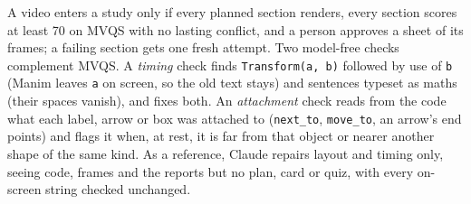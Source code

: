 A video enters a study only if every planned section renders, every section scores at least 70 on MVQS with no
lasting conflict, and a person approves a sheet of its frames; a failing section gets one fresh attempt. Two
model-free checks complement MVQS. A \emph{timing} check finds \texttt{Transform(a, b)} followed by use of \texttt{b}
(Manim leaves \texttt{a} on screen, so the old text stays) and sentences typeset as maths (their spaces vanish), and
fixes both. An \emph{attachment} check reads from the code what each label, arrow or box was attached to
(\texttt{next\_to}, \texttt{move\_to}, an arrow's end points) and flags it when, at rest, it is far from that object or
nearer another shape of the same kind. As a reference, Claude repairs layout and timing only, seeing code, frames and
the reports but no plan, card or quiz, with every on-screen string checked unchanged.




